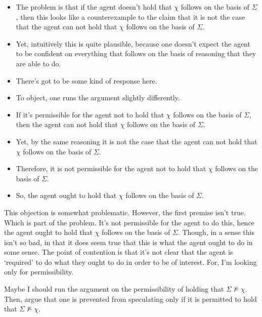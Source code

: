 \documentclass[10pt]{article}
\begin{document}
\begin{itemize}
\item The problem is that if the agent doesn't hold that \(\chi\) follows on the basis of \(\Sigma\), then this looks like a counterexample to the claim that it is not the case that the agent can not hold that \(\chi\) follows on the basis of \(\Sigma\).
\item Yet, intuitively this is quite plausible, because one doesn't expect the agent to be confident on everything that follows on the basis of reasoning that they are able to do.
\end{itemize}

\begin{itemize}
\item There's got to be some kind of response here.
\end{itemize}

\begin{itemize}
\item To object, one runs the argument slightly differently.
\item If it's permissible for the agent not to hold that \(\chi\) follows on the basis of \(\Sigma\), then the agent can not hold that \(\chi\) follows on the basis of \(\Sigma\).
\item Yet, by the same reasoning it is not the case that the agent can not hold that \(\chi\) follows on the basis of \(\Sigma\).
\item Therefore, it is not permissible for the agent not to hold that \(\chi\) follows on the basis of \(\Sigma\).
\item So, the agent ought to hold that \(\chi\) follows on the basis of \(\Sigma\).
\end{itemize}

This objection is somewhat problematic.
However, the first premise isn't true.
Which is part of the problem.
It's not permissible for the agent to do this, hence the agent ought to hold that \(\chi\) follows on the basis of \(\Sigma\).
Though, in a sense this isn't so bad, in that it does seem true that this is what the agent ought to do in some sense.
The point of contention is that it's not clear that the agent is `required' to do what they ought to do in order to be of interest.
For, I'm looking only for permissibility.


Maybe I should run the argument on the permissibility of holding that \(\Sigma \nvDash \chi\).
Then, argue that one is prevented from speculating only if it is permitted to hold that \(\Sigma \nvDash \chi\).
\end{document}

